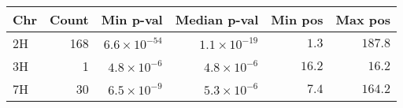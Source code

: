 \begin{longtable}{lrrrrr}
\toprule
Chr & Count & Min p-val & Median p-val & Min pos & Max pos \\ 
\midrule\addlinespace[2.5pt]
2H & 168 & $6.6 \times 10^{-54}$ & $1.1 \times 10^{-19}$ & $1.3$ & $187.8$ \\ 
3H & 1 & $4.8 \times 10^{-6}$ & $4.8 \times 10^{-6}$ & $16.2$ & $16.2$ \\ 
7H & 30 & $6.5 \times 10^{-9}$ & $5.3 \times 10^{-6}$ & $7.4$ & $164.2$ \\ 
\bottomrule
\end{longtable}


